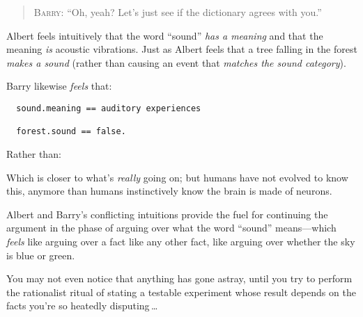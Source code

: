 {{\begin{quotation}
{
 \textsc{Barry}: ``Oh, yeah? Let's just see
 if the dictionary agrees with you.''}
\end{quotation}

{
 Albert feels intuitively that the word
``sound'' \textit{has a meaning} and
that the meaning \textit{is} acoustic vibrations. Just as Albert feels
that a tree falling in the forest \textit{makes a sound} (rather than
causing an event that \textit{matches the sound category}).}

{
 Barry likewise \textit{feels} that:}

\begin{verbatim}
  sound.meaning == auditory experiences

  forest.sound == false.
\end{verbatim}

{
 Rather than:}


{
 Which is closer to what's \textit{really} going
on; but humans have not evolved to know this, anymore than humans
instinctively know the brain is made of neurons.}

{
 Albert and Barry's conflicting intuitions provide
the fuel for continuing the argument in the phase of arguing over what
the word ``sound'' means---which
\textit{feels} like arguing over a fact like any other fact, like
arguing over whether the sky is blue or green.}

{
 You may not even notice that anything has gone astray, until you
try to perform the rationalist ritual of stating a testable experiment
whose result depends on the facts you're so heatedly
disputing\,\ldots}

\myendsectiontext

}}
